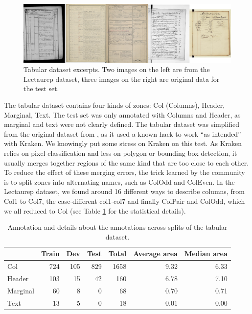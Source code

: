 \documentclass{jdmdh}
\begin{document}
\begin{figure}
    \centering
    \includegraphics[width=\linewidth]{images/table.jpg}
    \caption{Tabular dataset excerpts. Two images on the left are from the Lectaurep dataset, three images on the right are original data for the test set.}
    \label{fig:dataset:table}
\end{figure}

The tabular dataset contains four kinds of zones: Col (Columns), Header, Marginal, Text. The test set was only annotated with Columns and Header, as marginal and text were not clearly defined. The tabular dataset was simplified from the original dataset from \citet{p2021notaires}, as it used a known hack to work ``as intended'' with Kraken. We knowingly put some stress on Kraken on this test. As Kraken relies on pixel classification and less on polygon or bounding box detection, it usually merges together regions of the same kind that are too close to each other. To reduce the effect of these merging errors, the trick learned by the community is to split zones into alternating names, such as ColOdd and ColEven. In the Lectaurep dataset, we found around 16 different ways to describe columns, from Col1 to Col7, the case-different col1-col7 and finally ColPair and ColOdd, which we all reduced to Col (see Table \ref{tab:comp:tabular} for the statistical details).

\begin{table}[ht]
    \centering
    \begin{tabular}{l|rrr|r|rr}
    \hline
              &   Train &   Dev &   Test &   Total &   Average area &   Median area \\
    \hline
     Col      &     724 &   105 &    829 &    1658 &           9.32 &          6.33 \\
     Header   &     103 &    15 &     42 &     160 &           6.78 &          7.10 \\
     Marginal &      60 &     8 &      0 &      68 &           0.70 &          0.71 \\
     Text     &      13 &     5 &      0 &      18 &           0.01 &          0.00 \\
    \hline
    \end{tabular}
    \caption{Annotation and details about the annotations across splits of the tabular  dataset.}
    \label{tab:comp:tabular}
\end{table}
\end{document}
